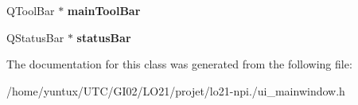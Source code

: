 \begin{DoxyCompactItemize}
\item 
\hypertarget{class_ui___main_window_a5172877001c8c7b4e0f6de50421867d1}{\-Q\-Tool\-Bar $\ast$ {\bfseries main\-Tool\-Bar}}\label{class_ui___main_window_a5172877001c8c7b4e0f6de50421867d1}

\item 
\hypertarget{class_ui___main_window_a50fa481337604bcc8bf68de18ab16ecd}{\-Q\-Status\-Bar $\ast$ {\bfseries status\-Bar}}\label{class_ui___main_window_a50fa481337604bcc8bf68de18ab16ecd}

\end{DoxyCompactItemize}


\-The documentation for this class was generated from the following file\-:\begin{DoxyCompactItemize}
\item 
/home/yuntux/\-U\-T\-C/\-G\-I02/\-L\-O21/projet/lo21-\/npi./ui\-\_\-mainwindow.\-h\end{DoxyCompactItemize}

